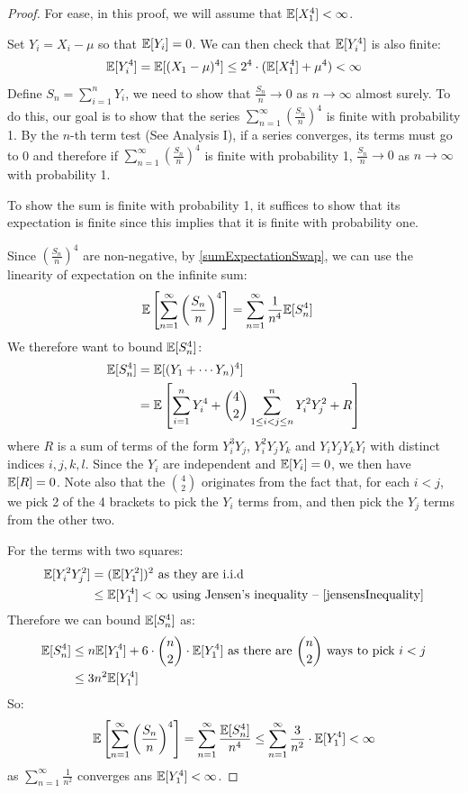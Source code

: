 \documentclass[../main.tex]{subfiles}
\begin{document}
\begin{proof}
  \nonexaminable
  For ease, in this proof, we will assume that $\mathbb{E}[X^4_1] < \infty$.

  Set $Y_i = X_i - \mu$ so that $\mathbb{E}[Y_i] = 0$.
  We can then check that $\mathbb{E}[Y^4_i]$ is also finite:
  \[
    \mathbb{E}[Y^4_i] = \mathbb{E}[(X_1 - \mu)^4] \leq 2^{4} \cdot (\mathbb{E}[X^4_1] + \mu^4) < \infty
  \]
  Define $S_n = \sum_{i = 1}^{n} Y_i$, we need to show that $\frac{S_n}{n} \to 0$  as $n \to \infty$ almost surely.
  To do this, our goal is to show that the series $\sum_{n = 1}^{\infty} (\frac{S_n}{n})^4$ is finite with probability 1.
  By the $n$-th term test (See Analysis I), if a series converges, its terms must go to 0 and therefore if $\sum_{n = 1}^{\infty} (\frac{S_n}{n})^4$ is finite with probability 1, $\frac{S_n}{n} \to 0$ as $n \to \infty$ with probability 1.

  To show the sum is finite with probability 1, it suffices to show that its expectation is finite since this implies that it is finite with probability one.

  Since $(\frac{S_n}{n})^4$ are non-negative, by \cref{sumExpectationSwap}, we can use the linearity of expectation on the infinite sum:
  \begin{align*}
    \mathbb{E}\left[\sum_{n = 1}^{\infty} \left(\frac{S_n}{n}\right)^4\right] &= \sum_{n = 1}^{\infty}\frac{1}{n^4} \mathbb{E}[S^4_n]
  \end{align*}
  We therefore want to bound $\mathbb{E}[S^4_n]$:
  \begin{align*}
    \mathbb{E}[S^4_n] &= \mathbb{E}[(Y_1 + \cdots Y_n)^4] \\
              &= \mathbb{E}\left[\sum_{i = 1}^{n} Y^4_i + \binom{4}{2}\sum_{1 \leq i < j \leq n}^{n} Y^2_i Y^2_j + R\right]
  \end{align*}
  where $R$ is a sum of terms of the form $Y^3_iY_j$, $Y^2_iY_jY_k$ and $Y_iY_jY_kY_l$ with distinct indices $i, j, k, l$.
  Since the $Y_i$ are independent and $\mathbb{E}[Y_i] = 0$, we then have $\mathbb{E}[R] = 0$.
  Note also that the $\binom{4}{2}$ originates from the fact that, for each $i < j$, we pick 2 of the 4 brackets to pick the $Y_i$ terms from, and then pick the $Y_j$ terms from the other two.

  For the terms with two squares:
  \begin{align*}
    \E[Y^2_iY^2_j] &= (\E[Y^2_1])^2 \text{ as they are i.i.d}\\
                   &\leq \E[Y^4_1] < \infty \text{ using Jensen's inequality -- \cref{jensensInequality}}
  \end{align*}
  Therefore we can bound $\mathbb{E}[S^4_n]$ as:
  \begin{align*}
    \mathbb{E}[S^4_n] &\leq n \mathbb{E}[Y^4_1] + 6 \cdot \binom{n}{2} \cdot \mathbb{E}[Y^4_1] \text{ as there are $\binom{n}{2}$ ways to pick $i < j$} \\
              &\leq 3n^2 \mathbb{E}[Y^4_1]
  \end{align*}
  So:
  \[
    \mathbb{E}\left[\sum_{n = 1}^{\infty} \left(\frac{S_n}{n}\right)^4\right] = \sum_{n = 1}^{\infty} \frac{\mathbb{E}[S^4_n]}{n^4} \leq \sum_{n = 1}^{\infty} \frac{3}{n^2} \cdot \mathbb{E}[Y^4_1] < \infty
  \]
  as $\sum_{n = 1}^{\infty} \frac{1}{n^2}$ converges ans $\mathbb{E}[Y^4_1] < \infty$.
\end{proof}
\end{document}
